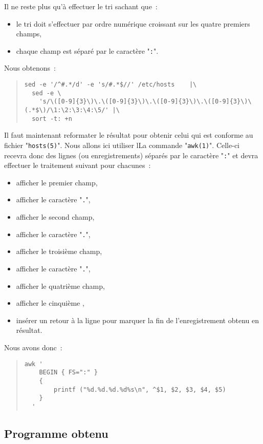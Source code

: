 Il ne reste plus qu'{\`a} effectuer le tri sachant que~:
\begin{itemize}
	\item	le tri doit s'effectuer par ordre num{\'e}rique croissant sur les
			quatre premiers champs,
	\item	chaque champ est s{\'e}par{\'e} par le caract{\`e}re "{\tt :}".
\end{itemize}
Nous obtenons~:
\begin{quote}
\begin{verbatim}
sed -e '/^#.*/d' -e 's/#.*$//' /etc/hosts    |\
  sed -e \
    's/\([0-9]{3}\)\.\([0-9]{3}\)\.\([0-9]{3}\)\.\([0-9]{3}\)\(.*$\)/\1:\2:\3:\4:\5/' |\
  sort -t: +n
\end{verbatim}
\end{quote}

Il faut maintenant reformater le r{\'e}sultat pour obtenir celui qui est conforme
au fichier "{\tt hosts(5)}". Nous allons ici utiliser lLa commande "{\tt awk(1)}".
Celle-ci recevra donc des lignes (ou enregistrements) s{\'e}par{\'e}s par le caract{\`e}re "{\tt :}"
et devra effectuer le traitement suivant pour chacunes~:
\begin{itemize}
	\item	afficher le premier champ,
	\item	afficher le caract{\`e}re "{\tt .}",
	\item	afficher le second champ,
	\item	afficher le caract{\`e}re "{\tt .}",
	\item	afficher le troisi{\`e}me champ,
	\item	afficher le caract{\`e}re "{\tt .}",
	\item	afficher le quatri{\`e}me champ,
	\item	afficher le cinqui{\`e}me ,
	\item	ins{\'e}rer un retour {\`a} la ligne pour marquer la fin de l'enregistrement obtenu
			en r{\'e}sultat.
\end{itemize}
Nous avons donc~:
\begin{quote}
\begin{verbatim}
awk '
    BEGIN { FS=":" }
    {
        printf ("%d.%d.%d.%d%s\n", ^$1, $2, $3, $4, $5)
    }
  '
\end{verbatim}
\end{quote}

\subsection{Programme obtenu}

